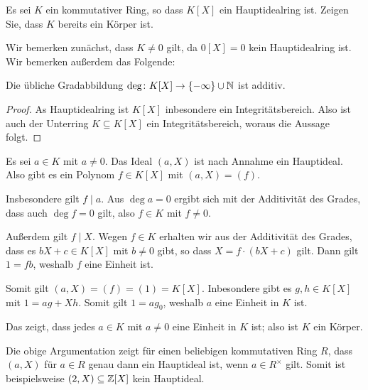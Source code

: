 \begin{question}[subtitle = Polynomringe als Hauptidealringe]
  \label{question: fields are the only rings for which the polynomial ring is a pid}
  Es sei $K$ ein kommutativer Ring, so dass $K[X]$ ein Hauptidealring ist.
  Zeigen Sie, dass $K$ bereits ein Körper ist.
\end{question}


\begin{solution}
  Wir bemerken zunächst, dass $K \neq 0$ gilt, da $0[X] = 0$ kein Hauptidealring ist.
  Wir bemerken außerdem das Folgende:
  
  \begin{claim*}
    \label{claim: degree is additive}
    Die übliche Gradabbildung $\deg \colon K[X] \to \{-\infty\} \cup \mathbb{N}$ ist additiv.
  \end{claim*}
  \begin{proof}
    As Hauptidealring ist $K[X]$ inbesondere ein Integritätsbereich.
    Also ist auch der Unterring $K \subseteq K[X]$ ein Integritätsbereich, woraus die Aussage folgt.
  \end{proof}

  Es sei $a \in K$ mit $a \neq 0$.
  Das Ideal $(a, X)$ ist nach Annahme ein Hauptideal.
  Also gibt es ein Polynom $f \in K[X]$ mit $(a,X) = (f)$.
  
  Insbesondere gilt $f \mid a$.
  Aus $\deg a = 0$ ergibt sich mit der Additivität des Grades, dass auch $\deg f = 0$ gilt, also $f \in K$ mit $f \neq 0$.
  
  Außerdem gilt $f \mid X$.
  Wegen $f \in K$ erhalten wir aus der Additivität des Grades, dass es $bX+c \in K[X]$ mit $b \neq 0$ gibt, so dass $X = f \cdot (bX+c)$ gilt.
  Dann gilt $1 = fb$, weshalb $f$ eine Einheit ist.
  
  Somit gilt $(a,X) = (f) = (1) = K[X]$.
  Inbesondere gibt es $g, h \in K[X]$ mit $1 = ag + Xh$.
  Somit gilt $1 = a g_0$, weshalb $a$ eine Einheit in $K$ ist.
  
  Das zeigt, dass jedes $a \in K$ mit $a \neq 0$ eine Einheit in $K$ ist;
  also ist $K$ ein Körper.
  
  \begin{remark*}
    Die obige Argumentation zeigt für einen beliebigen kommutativen Ring $R$, dass $(a, X)$ für $a \in R$ genau dann ein Hauptideal ist, wenn $a \in R^\times$ gilt.
    Somit ist beispielsweise $(2, X) \subseteq \mathbb{Z}[X]$ kein Hauptideal.
  \end{remark*}
\end{solution}


